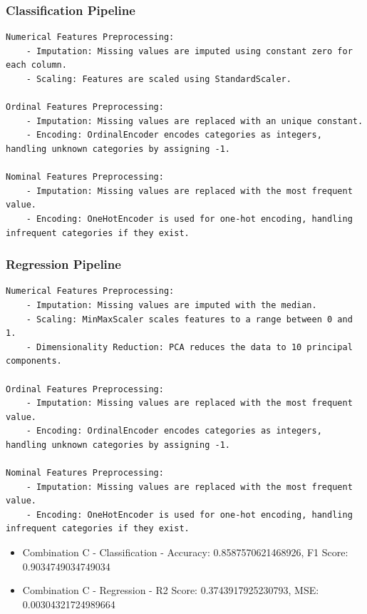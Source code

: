 \documentclass{article}
\begin{document}
\subsubsection*{Classification Pipeline}

\begin{lstlisting}
Numerical Features Preprocessing:
    - Imputation: Missing values are imputed using constant zero for each column.
    - Scaling: Features are scaled using StandardScaler.

Ordinal Features Preprocessing:
    - Imputation: Missing values are replaced with an unique constant.
    - Encoding: OrdinalEncoder encodes categories as integers, handling unknown categories by assigning -1.

Nominal Features Preprocessing:
    - Imputation: Missing values are replaced with the most frequent value.
    - Encoding: OneHotEncoder is used for one-hot encoding, handling infrequent categories if they exist.

\end{lstlisting}

\subsubsection*{Regression Pipeline}

\begin{lstlisting}
Numerical Features Preprocessing:
    - Imputation: Missing values are imputed with the median.
    - Scaling: MinMaxScaler scales features to a range between 0 and 1.
    - Dimensionality Reduction: PCA reduces the data to 10 principal components.

Ordinal Features Preprocessing:
    - Imputation: Missing values are replaced with the most frequent value.
    - Encoding: OrdinalEncoder encodes categories as integers, handling unknown categories by assigning -1.

Nominal Features Preprocessing:
    - Imputation: Missing values are replaced with the most frequent value.
    - Encoding: OneHotEncoder is used for one-hot encoding, handling infrequent categories if they exist.

\end{lstlisting}

\begin{itemize}
\item Combination C - Classification - Accuracy: 0.8587570621468926, F1 Score: 0.9034749034749034
\item Combination C - Regression - R2 Score: 0.3743917925230793, MSE: 0.00304321724989664
\end{itemize}
\end{document}
